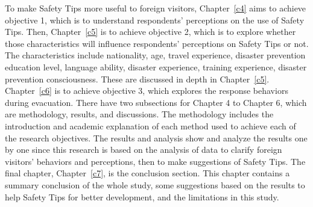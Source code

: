 To make Safety Tips more useful to foreign visitors, Chapter~\ref{c4} aims to achieve objective 1, which is to understand respondents' perceptions on the use of Safety Tips. Then, Chapter~\ref{c5} is to achieve objective 2, which is to explore whether those characteristics will influence respondents'  perceptions on Safety Tips or not. The characteristics include nationality, age, travel experience, disaster prevention education level, language ability, disaster experience, training experience, disaster prevention consciousness. These are discussed in depth in Chapter~\ref{c5}. Chapter~\ref{c6} is to achieve objective 3, which explores the response behaviors during evacuation. There have two subsections for Chapter 4 to Chapter 6, which are methodology, results, and discussions. The methodology includes the introduction and academic explanation of each method used to achieve each of the research objectives. The results and analysis show and analyze the results one by one since this research is based on the analysis of data to clarify foreign visitors' behaviors and perceptions, then to make suggestions of Safety Tips. The final chapter, Chapter~\ref{c7}, is the conclusion section. This chapter contains a summary conclusion of the whole study, some suggestions based on the results to help Safety Tips for better development, and the limitations in this study.




